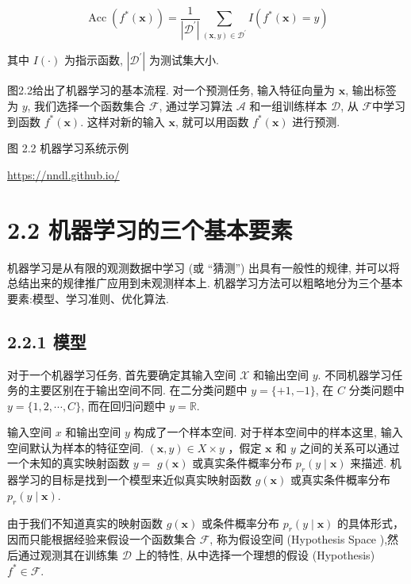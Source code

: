 \documentclass[10pt]{article}
\begin{document}
\begin{equation*}
\operatorname{Acc}\left(f^{*}(\boldsymbol{x})\right)=\frac{1}{\left|\mathcal{D}^{\prime}\right|} \sum_{(\boldsymbol{x}, y) \in \mathcal{D}^{\prime}} I\left(f^{*}(\boldsymbol{x})=y\right) \tag{2.4}
\end{equation*}


其中 $I(\cdot)$ 为指示函数, $\left|\mathcal{D}^{\prime}\right|$ 为测试集大小.

图2.2给出了机器学习的基本流程. 对一个预测任务, 输入特征向量为 $\boldsymbol{x}$, 输出标签为 $y$, 我们选择一个函数集合 $\mathcal{F}$, 通过学习算法 $\mathcal{A}$ 和一组训练样本 $\mathcal{D}$, 从 $\mathcal{F}$中学习到函数 $f^{*}(\boldsymbol{x})$. 这样对新的输入 $\boldsymbol{x}$, 就可以用函数 $f^{*}(\boldsymbol{x})$ 进行预测.



图 2.2 机器学习系统示例

\href{https://nndl.github.io/}{https://nndl.github.io/}

\section*{2.2 机器学习的三个基本要素}
机器学习是从有限的观测数据中学习 (或 “猜测”) 出具有一般性的规律, 并可以将总结出来的规律推广应用到未观测样本上. 机器学习方法可以粗略地分为三个基本要素:模型、学习准则、优化算法.

\subsection*{2.2.1 模型}
对于一个机器学习任务, 首先要确定其输入空间 $\mathcal{X}$ 和输出空间 $y$. 不同机器学习任务的主要区别在于输出空间不同. 在二分类问题中 $y=\{+1,-1\}$, 在 $C$ 分类问题中 $y=\{1,2, \cdots, C\}$, 而在回归问题中 $y=\mathbb{R}$.

输入空间 $x$ 和输出空间 $y$ 构成了一个样本空间. 对于样本空间中的样本这里, 输入空间默认为样本的特征空间. $(\boldsymbol{x}, y) \in X \times y$ ，假定 $\boldsymbol{x}$ 和 $y$ 之间的关系可以通过一个未知的真实映射函数 $y=$ $g(\boldsymbol{x})$ 或真实条件概率分布 $p_{r}(y \mid \boldsymbol{x})$ 来描述. 机器学习的目标是找到一个模型来近似真实映射函数 $g(\boldsymbol{x})$ 或真实条件概率分布 $p_{r}(y \mid \boldsymbol{x})$.

由于我们不知道真实的映射函数 $g(\boldsymbol{x})$ 或条件概率分布 $p_{r}(y \mid \boldsymbol{x})$ 的具体形式，因而只能根据经验来假设一个函数集合 $\mathcal{F}$, 称为假设空间 (Hypothesis Space ),然后通过观测其在训练集 $\mathcal{D}$ 上的特性, 从中选择一个理想的假设 (Hypothesis) $f^{*} \in \mathcal{F}$.
\end{document}
